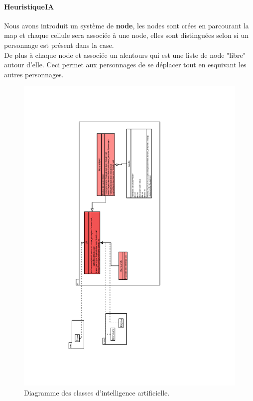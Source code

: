\documentclass[a4paper,12pt]{article}
\begin{document}
\paragraph{HeuristiqueIA}
Nous avons introduit un système de \textbf{node}, les nodes sont crées en parcourant la map et chaque cellule sera associée à une node, elles sont distinguées selon si un personnage est présent dans la case.\\
De plus à chaque node et associée un alentours qui est une liste de node "libre" autour d'elle. Ceci permet aux personnages de se déplacer tout en esquivant les autres personnages. 
\begin{landscape}
\begin{figure}[p]
\includegraphics[width=0.6\paperheight,angle=270]{ai.pdf}
\caption{\label{uml:ai}Diagramme des classes d'intelligence artificielle.} 
\end{figure}
\end{landscape}
\end{document}

